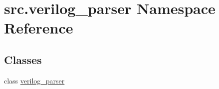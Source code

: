 \hypertarget{namespacesrc_1_1verilog__parser}{\section{src.\-verilog\-\_\-parser Namespace Reference}
\label{namespacesrc_1_1verilog__parser}
}
\subsection*{Classes}
\begin{DoxyCompactItemize}
\item 
class \hyperlink{classsrc_1_1verilog__parser_1_1verilog__parser}{verilog\-\_\-parser}
\end{DoxyCompactItemize}
